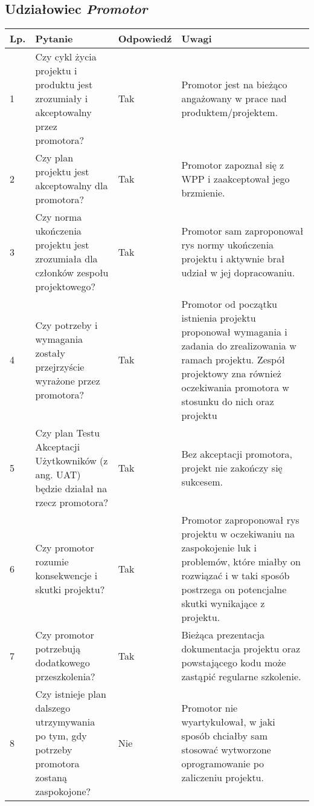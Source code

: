\documentclass[11pt,oneside,a4paper,titlepage,onecolumn]{article}
\begin{document}
\subsection{Udziałowiec \textit{Promotor}}

\begin{tabularx}{\textwidth}{|l|X|l|X|}
	\hline
	
	\hline
    Lp. & Pytanie & Odpowiedź & Uwagi \\ \hline
    
    1
    & Czy cykl życia projektu i produktu jest zrozumiały i
    akceptowalny przez promotora?
    & Tak
    & Promotor jest na bieżąco angażowany w prace nad
    produktem/projektem.
    \\\hline
    
    2
    & Czy plan projektu jest akceptowalny dla promotora?
    & Tak
    & Promotor zapoznał się z WPP i zaakceptował jego brzmienie.
    \\\hline
    
    3
    & Czy norma ukończenia projektu jest zrozumiała dla członków
    zespołu projektowego?
    & Tak
    & Promotor sam zaproponował rys normy ukończenia projektu i
    aktywnie brał udział w jej dopracowaniu.
    \\\hline
    
    4
    & Czy potrzeby i wymagania zostały przejrzyście wyrażone
    przez promotora?
    & Tak
    & Promotor od początku istnienia projektu proponował wymagania
    i zadania do zrealizowania w ramach projektu. Zespół projektowy
    zna również oczekiwania promotora w stosunku do nich oraz
    projektu
    \\\hline
    
    5
    & Czy plan Testu Akceptacji Użytkowników (z ang. UAT) będzie
    działał na rzecz promotora?
    & Tak
    & Bez akceptacji promotora, projekt nie zakończy się sukcesem.
    \\\hline
    
    6
    & Czy promotor rozumie konsekwencje i skutki projektu?
    & Tak
    & Promotor zaproponował rys projektu w oczekiwaniu na 
    zaspokojenie luk i problemów, które miałby on rozwiązać i
    w taki sposób postrzega on potencjalne skutki wynikające
    z projektu.
    \\\hline
    
    7
    & Czy promotor potrzebują dodatkowego przeszkolenia?
    & Tak
    & Bieżąca prezentacja dokumentacja projektu oraz powstającego
    kodu może zastąpić regularne szkolenie.
    \\\hline
    
    8
    & Czy istnieje plan dalszego utrzymywania po tym, gdy
    potrzeby promotora zostaną zaspokojone?
    & Nie
    & Promotor nie wyartykułował, w jaki sposób chciałby sam
    stosować wytworzone oprogramowanie po zaliczeniu projektu.
    \\\hline
    
\end{tabularx}
\end{document}
